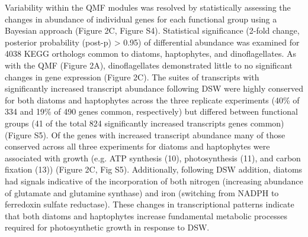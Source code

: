 Variability within the QMF modules was resolved by statistically assessing the changes in abundance of individual genes for each functional group using a Bayesian approach \citep{Wu2010} (Figure 2C, Figure S4). Statistical significance (2-fold change, posterior probability (post-p) > 0.95) of differential abundance was examined for 4038 KEGG orthologs common to diatoms, haptophytes, and dinoflagellates. As with the QMF (Figure 2A), dinoflagellates demonstrated little to no significant changes in gene expression (Figure 2C). The suites of transcripts with significantly increased transcript abundance following DSW were highly conserved for both diatoms and haptophytes across the three replicate experiments (40\% of 334 and 19\% of 490 genes common, respectively) but differed between functional groups (41 of the total 824 significantly increased transcripts genes common) (Figure S5). Of the genes with increased transcript abundance many of those conserved across all three experiments for diatoms and haptophytes were associated with growth (e.g. ATP synthesis (10), photosynthesis (11), and carbon fixation (13)) (Figure 2C, Fig S5). Additionally, following DSW addition, diatoms had signals indicative of the incorporation of both nitrogen (increasing abundance of glutamate and glutamine synthase) and iron (switching from NADPH to ferredoxin sulfate reductase). These changes in transcriptional patterns indicate that both diatoms and haptophytes increase fundamental metabolic processes required for photosynthetic growth in response to DSW. \par
